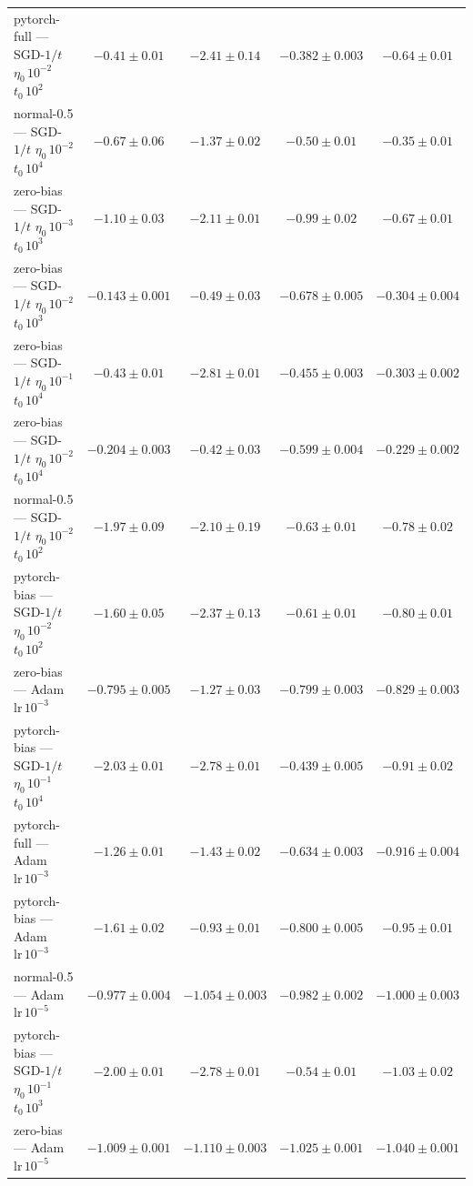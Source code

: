 \begin{table}[H]
\begin{tabular}{@{}>{\raggedright\arraybackslash}p{5.2cm} cccc@{}}
pytorch-full --- SGD-$1/t$ $\eta_0\,10^{-2}$ $t_0\,10^{2}$ & $-0.41 \pm 0.01$ & $-2.41 \pm 0.14$ & $-0.382 \pm 0.003$ & $-0.64 \pm 0.01$ \\
normal-0.5 --- SGD-$1/t$ $\eta_0\,10^{-2}$ $t_0\,10^{4}$ & $-0.67 \pm 0.06$ & $-1.37 \pm 0.02$ & \underline{$-0.50 \pm 0.01$} & $-0.35 \pm 0.01$ \\
zero-bias --- SGD-$1/t$ $\eta_0\,10^{-3}$ $t_0\,10^{3}$ & $-1.10 \pm 0.03$ & $-2.11 \pm 0.01$ & $-0.99 \pm 0.02$ & $-0.67 \pm 0.01$ \\
zero-bias --- SGD-$1/t$ $\eta_0\,10^{-2}$ $t_0\,10^{3}$ & $-0.143 \pm 0.001$ & \textbf{$-0.49 \pm 0.03$} & $-0.678 \pm 0.005$ & $-0.304 \pm 0.004$ \\
zero-bias --- SGD-$1/t$ $\eta_0\,10^{-1}$ $t_0\,10^{4}$ & $-0.43 \pm 0.01$ & $-2.81 \pm 0.01$ & $-0.455 \pm 0.003$ & $-0.303 \pm 0.002$ \\
zero-bias --- SGD-$1/t$ $\eta_0\,10^{-2}$ $t_0\,10^{4}$ & $-0.204 \pm 0.003$ & \underline{$-0.42 \pm 0.03$} & $-0.599 \pm 0.004$ & $-0.229 \pm 0.002$ \\
normal-0.5 --- SGD-$1/t$ $\eta_0\,10^{-2}$ $t_0\,10^{2}$ & $-1.97 \pm 0.09$ & $-2.10 \pm 0.19$ & $-0.63 \pm 0.01$ & $-0.78 \pm 0.02$ \\
pytorch-bias --- SGD-$1/t$ $\eta_0\,10^{-2}$ $t_0\,10^{2}$ & $-1.60 \pm 0.05$ & $-2.37 \pm 0.13$ & $-0.61 \pm 0.01$ & $-0.80 \pm 0.01$ \\
zero-bias --- Adam $\mathrm{lr}\,10^{-3}$ & $-0.795 \pm 0.005$ & $-1.27 \pm 0.03$ & $-0.799 \pm 0.003$ & $-0.829 \pm 0.003$ \\
pytorch-bias --- SGD-$1/t$ $\eta_0\,10^{-1}$ $t_0\,10^{4}$ & $-2.03 \pm 0.01$ & $-2.78 \pm 0.01$ & $-0.439 \pm 0.005$ & $-0.91 \pm 0.02$ \\
pytorch-full --- Adam $\mathrm{lr}\,10^{-3}$ & $-1.26 \pm 0.01$ & $-1.43 \pm 0.02$ & $-0.634 \pm 0.003$ & $-0.916 \pm 0.004$ \\
pytorch-bias --- Adam $\mathrm{lr}\,10^{-3}$ & $-1.61 \pm 0.02$ & $-0.93 \pm 0.01$ & $-0.800 \pm 0.005$ & $-0.95 \pm 0.01$ \\
normal-0.5 --- Adam $\mathrm{lr}\,10^{-5}$ & $-0.977 \pm 0.004$ & $-1.054 \pm 0.003$ & $-0.982 \pm 0.002$ & $-1.000 \pm 0.003$ \\
pytorch-bias --- SGD-$1/t$ $\eta_0\,10^{-1}$ $t_0\,10^{3}$ & $-2.00 \pm 0.01$ & $-2.78 \pm 0.01$ & $-0.54 \pm 0.01$ & $-1.03 \pm 0.02$ \\
zero-bias --- Adam $\mathrm{lr}\,10^{-5}$ & $-1.009 \pm 0.001$ & $-1.110 \pm 0.003$ & $-1.025 \pm 0.001$ & $-1.040 \pm 0.001$ \\

\end{tabular}
\end{table}
